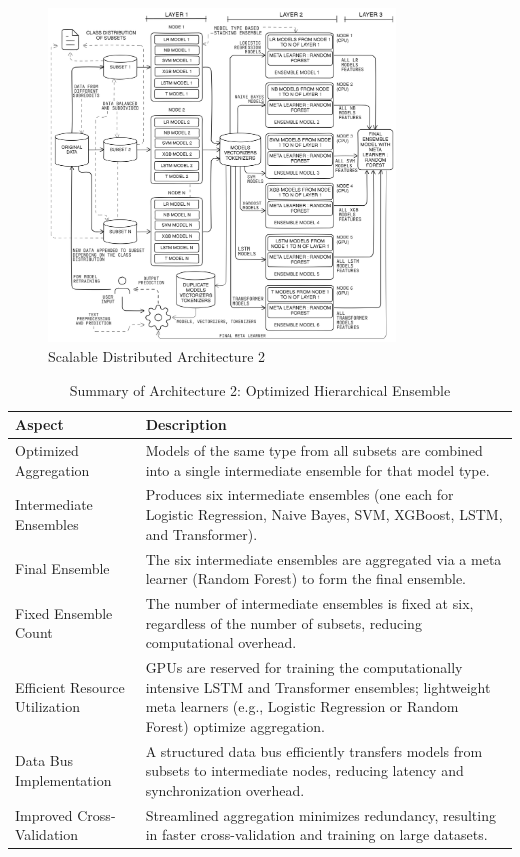 \pagebreak

\begin{figure}[h!]  
    \centering
    \includegraphics[width=0.82\textwidth]{Images/Distributed2.png}  
    \caption*{Scalable Distributed Architecture 2}
    \label{lstm archi}  %
\end{figure}

\begin{table}[H]
    \caption*{Summary of Architecture 2: Optimized Hierarchical Ensemble}
    \label{tab:arch2}
    \begin{tabularx}{\textwidth}{|p{3cm}|X|}
    \hline
    \textbf{Aspect} & \textbf{Description} \\ \hline
    Optimized Aggregation & Models of the same type from all subsets are combined into a single intermediate ensemble for that model type. \\ \hline
    Intermediate Ensembles & Produces six intermediate ensembles (one each for Logistic Regression, Naive Bayes, SVM, XGBoost, LSTM, and Transformer). \\ \hline
    Final Ensemble & The six intermediate ensembles are aggregated via a meta learner (Random Forest) to form the final ensemble. \\ \hline
    Fixed Ensemble Count & The number of intermediate ensembles is fixed at six, regardless of the number of subsets, reducing computational overhead. \\ \hline
    Efficient Resource Utilization & GPUs are reserved for training the computationally intensive LSTM and Transformer ensembles; lightweight meta learners (e.g., Logistic Regression or Random Forest) optimize aggregation. \\ \hline
    Data Bus Implementation & A structured data bus efficiently transfers models from subsets to intermediate nodes, reducing latency and synchronization overhead. \\ \hline
    Improved Cross-Validation & Streamlined aggregation minimizes redundancy, resulting in faster cross-validation and training on large datasets. \\ \hline
    \end{tabularx}
\end{table}
    

